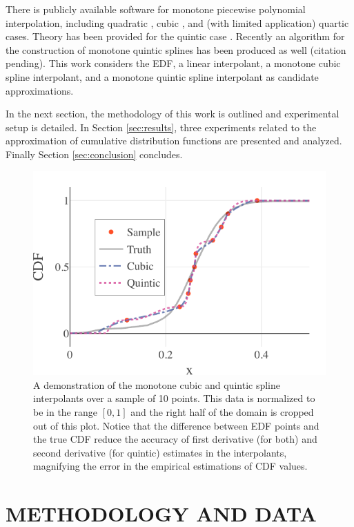 \documentclass[letterpaper, 10 pt, conference]{ieeeconf}  %
\begin{document}
There is publicly available software for monotone piecewise polynomial interpolation, including quadratic \cite{he1998monotone}, cubic \cite{fritsch1980monotone}, and (with limited application) quartic \cite{wang2004rational,piah2011improved,yao2018unconditionally} cases. Theory has been provided for the quintic case \cite{ulrich1994positivity,hess1994positive}. Recently an algorithm for the construction of monotone quintic splines has been produced as well (citation pending).%
This work considers the EDF, a linear interpolant, a monotone cubic spline interpolant, and a monotone quintic spline interpolant as candidate approximations.

In the next section, the methodology of this work is outlined and experimental setup is detailed. In Section \ref{sec:results}, three experiments related to the approximation of cumulative distribution functions are presented and analyzed. Finally Section \ref{sec:conclusion} concludes.


\begin{figure}
  \vspace{-.3cm}
  \includegraphics[width=.5\textwidth]{cq-sample-prediction.pdf}
  \caption{A demonstration of the monotone cubic and quintic spline interpolants over a sample of 10 points. This data is normalized to be in the range $[0,1]$ and the right half of the domain is cropped out of this plot. Notice that the difference between EDF points and the true CDF reduce the accuracy of first derivative (for both) and second derivative (for quintic) estimates in the interpolants, magnifying the error in the empirical estimations of CDF values.
  }
  \label{fig:sample-prediction}
\end{figure}

\section{METHODOLOGY AND DATA}
\label{sec:methodology}
\end{document}
